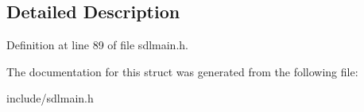 \begin{DoxyCompactItemize}
\end{tabbing}\end{DoxyCompactItemize}


\subsection{Detailed Description}


Definition at line 89 of file sdlmain.\-h.



The documentation for this struct was generated from the following file\-:\begin{DoxyCompactItemize}
\item 
include/sdlmain.\-h\end{DoxyCompactItemize}
